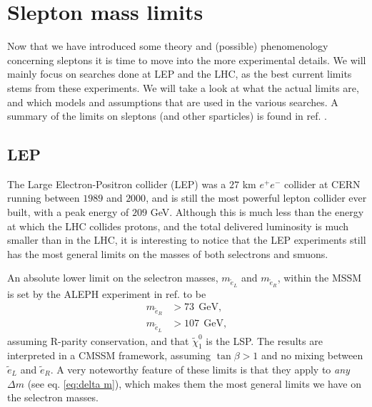 \documentclass[twocolumn,a4paper,10pt]{article}
\begin{document}
\section{Slepton mass limits}

Now that we have introduced some theory and (possible) phenomenology concerning sleptons it is time to 
move into 
the more experimental details. We will  mainly focus on searches done at LEP and the LHC, as the best 
current limits stems from these experiments. We will take a look at what the actual limits are, and 
which models and assumptions that are used in the various searches. A summary of the limits on 
sleptons (and other sparticles) is found in ref. \cite{PDG}.     

\subsection{LEP}

The Large Electron-Positron collider (LEP) was a $27$ km $e^+e^-$ collider at CERN running between 
$1989$ and $2000$, and is still the most powerful lepton collider ever built, with a peak energy of 
$209$ GeV. Although this is much less than the energy at which the LHC collides protons, and the 
total delivered luminosity is much smaller than in the LHC, it is interesting to notice that the 
LEP experiments still has the most general limits on the masses of both selectrons and smuons.  

An absolute lower limit on the selectron masses, $m_{\tilde{e}_L}$ and $m_{\tilde{e}_R}$,  within the 
MSSM is set by the ALEPH experiment in ref. \cite{ALEPH:2002} to be  
\begin{align*}
m_{\tilde{e}_R} & > 73 \:\: \text{GeV}, \\
m_{\tilde{e}_L} & > 107 \:\: \text{GeV},   
\end{align*}       
assuming R-parity conservation, and that $\tilde{\chi}_1^0$ is the LSP. The results are interpreted in 
a CMSSM framework, assuming $\tan\beta > 1$ and no mixing between $\tilde{e}_L$ and $\tilde{e}_R$.  
A very noteworthy feature of these limits is that they apply to \textit{any} $\Delta m$ (see eq. 
\ref{eq:delta m}), which makes them the most general limits we have on the selectron masses.  
\end{document}
